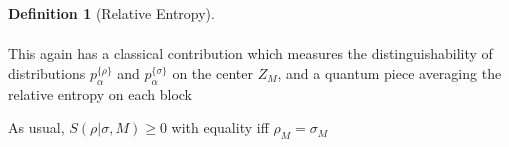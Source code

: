 \documentclass[12pt,a4paper]{article}
\numberwithin{equation}{section}
\theoremstyle{definition}
\newtheorem{definition}{Definition}[section]
\theoremstyle{theorem}
\begin{document}
\begin{itemize}
\begin{definition}[Relative Entropy]
\begin{equation}
\begin{aligned}
				\end{aligned}
			\end{equation}
			\item This again has a classical contribution which measures the distinguishability of distributions $p_{\alpha}^{\{\rho\}}$ and $p_{\alpha}^{\{\sigma\}}$ on the center $Z_{M}$, and a quantum piece averaging the relative entropy on each block
			\item As usual, $S(\rho|\sigma,M)\geq 0$ with equality iff $\rho_{M}=\sigma_{M}$
		\end{definition}
	\end{itemize}
\end{document}
